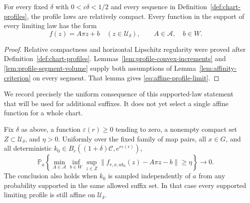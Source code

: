 \begin{proposition}\label{prop:affine-profiles}
For every fixed $\delta$ with $0<c\delta<1/2$ and every sequence
in Definition~\ref{def:chart-profiles}, the profile laws are
relatively compact.  Every function in the support of every
limiting law has the form
\begin{equation}\label{eq:affine-profile-limit}
 f(z)=A\pi z+b\quad(z\in\mathcal U_\delta),
 \qquad A\in\mathcal A,\quad b\in W.
\end{equation}
\end{proposition}

\begin{proof}
Relative compactness and horizontal Lipschitz regularity were
proved after Definition~\ref{def:chart-profiles}.
Lemmas~\ref{lem:profile-convex-increments} and
\ref{lem:profile-segment-volume} supply both assumptions of
Lemma~\ref{lem:affinity-criterion} on every segment.  That lemma
gives \eqref{eq:affine-profile-limit}.
\end{proof}

We record precisely the uniform consequence of this supported-law
statement that will be used for additional suffixes.  It does not
yet select a single affine function for a whole chart.

\begin{corollary}\label{cor:affine-profile-concentration}
Fix $\delta$ as above, a function $\varepsilon(r)\ge0$ tending to
zero, a nonempty compact set $Z\subset\mathcal U_\delta$, and
$\eta>0$.  Uniformly over the fixed family of map pairs, all
$x\in G$, and all deterministic
$k_0\in B_r((1+\delta)\mathcal C,e^{r\varepsilon(r)})$,
\begin{equation}\label{eq:distance-to-affine-class}
 \mathbb P_a\left\{
  \min_{A\in\mathcal A}\inf_{b\in W}
     \sup_{z\in Z}\|f_{r,x,ak_0}(z)-A\pi z-b\|\ge\eta
                 \right\}\longrightarrow0.
\end{equation}
The conclusion also holds when $k_0$ is sampled independently of
$a$ from any probability supported in the same allowed suffix
set.  In that case every supported limiting profile is still
affine on $\mathcal U_\delta$.
\end{corollary}

